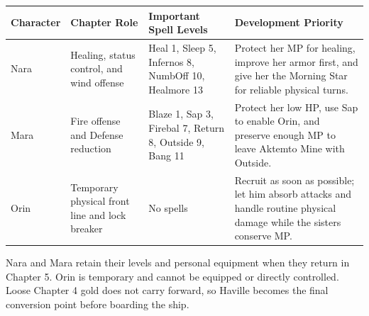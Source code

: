 \documentclass[
  american,
  10pt,
  letterpaper,
  oneside,
  open=any]{scrreprt}
\newcounter{none} %
\newenvironment{guidetable}{%
  \small\setstretch{1.0}%
  \setlength{\tabcolsep}{4pt}%
  \setlength{\LTpre}{8pt}\setlength{\LTpost}{10pt}%
  \renewcommand{\arraystretch}{1.16}%
}{ }
\begin{document}
\begin{guidetable}

{\def\LTcaptype{none} %
\begin{longtable}[]{@{}
  >{\raggedright\arraybackslash}p{}
  >{\raggedright\arraybackslash}p{}
  >{\raggedright\arraybackslash}p{}
  >{\raggedright\arraybackslash}p{}@{}}
\toprule\noalign{}
\begin{minipage}[b]{\linewidth}\raggedright
\color{GuideGreen}\bfseries Character
\end{minipage} & \begin{minipage}[b]{\linewidth}\raggedright
\color{GuideGreen}\bfseries Chapter Role
\end{minipage} & \begin{minipage}[b]{\linewidth}\raggedright
\color{GuideGreen}\bfseries Important Spell Levels
\end{minipage} & \begin{minipage}[b]{\linewidth}\raggedright
\color{GuideGreen}\bfseries Development Priority
\end{minipage} \\
\midrule\noalign{}
\endhead
\bottomrule\noalign{}
\endlastfoot
Nara & Healing, status control, and wind offense & Heal 1, Sleep 5,
Infernos 8, NumbOff 10, Healmore 13 & Protect her MP for healing,
improve her armor first, and give her the Morning Star for reliable
physical turns. \\
Mara & Fire offense and Defense reduction & Blaze 1, Sap 3, Firebal 7,
Return 8, Outside 9, Bang 11 & Protect her low HP, use Sap to enable
Orin, and preserve enough MP to leave Aktemto Mine with Outside. \\
Orin & Temporary physical front line and lock breaker & No spells &
Recruit as soon as possible; let him absorb attacks and handle routine
physical damage while the sisters conserve MP. \\
\end{longtable}
}

\end{guidetable}

Nara and Mara retain their levels and personal equipment when they
return in Chapter 5. Orin is temporary and cannot be equipped or
directly controlled. Loose Chapter 4 gold does not carry forward, so
Haville becomes the final conversion point before boarding the ship.
\end{document}
